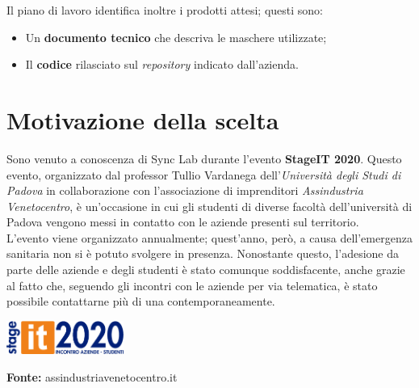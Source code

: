 Il piano di lavoro identifica inoltre i prodotti attesi; questi sono:
\begin{itemize}
  \item Un \textbf{documento tecnico} che descriva le maschere utilizzate;
  \item Il \textbf{codice} rilasciato sul \textit{repository} indicato dall'azienda.
\end{itemize}


\section{Motivazione della scelta}

Sono venuto a conoscenza di Sync Lab durante l'evento \textbf{StageIT 2020}. Questo evento, organizzato dal professor Tullio Vardanega dell'\textit{Università degli Studi di Padova} in collaborazione con l'associazione di imprenditori \textit{Assindustria Venetocentro}, è un'occasione in cui gli studenti di diverse facoltà dell'università di Padova vengono messi in contatto con le aziende presenti sul territorio. \\
L'evento viene organizzato annualmente; quest'anno, però, a causa dell'emergenza sanitaria non si è potuto svolgere in presenza. Nonostante questo, l'adesione da parte delle aziende e degli studenti è stato comunque soddisfacente, anche grazie al fatto che, seguendo gli incontri con le aziende per via telematica, è stato possibile contattarne più di una contemporaneamente. \\

\begin{minipage}{\linewidth}
  \centering
    \includegraphics[height=1.1cm]{immagini/stageit}
  \caption*{\textbf{Fonte:} assindustriavenetocentro.it}
\end{minipage} \\

